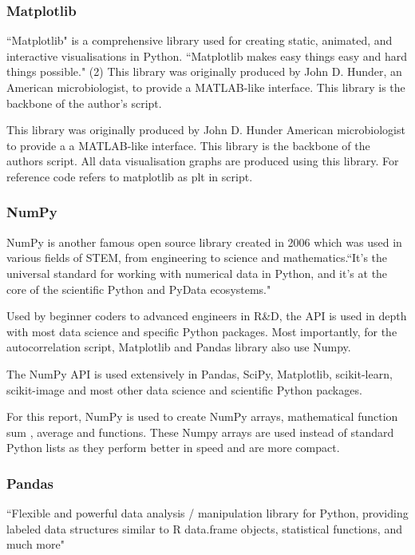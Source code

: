 \subsubsection{Matplotlib}
``Matplotlib" is a comprehensive library used for creating static, animated, and interactive visualisations in Python. ``Matplotlib makes easy things easy and hard things possible." (2)
This library was originally produced by John D. Hunder, an American microbiologist, to provide a MATLAB-like interface. This library is the backbone of the author's script. \cite{matplotlib}

This library was originally produced by John D. Hunder American microbiologist to provide a a MATLAB-like interface. 
This library is the backbone of the authors script. All data visualisation graphs are produced using this library. For reference code refers to matplotlib as plt in script. 

\subsubsection{NumPy}
NumPy is another famous open source library created in 2006 which was used in various fields of STEM, from engineering to science and mathematics.``It’s the universal standard for working with numerical data in Python, and it’s at the core of the scientific Python and PyData ecosystems." \cite{mhvk}

Used by beginner coders to advanced engineers in R\&D, the API is used in depth with most data science and specific Python packages. Most importantly, for the autocorrelation script, Matplotlib and Pandas library also use Numpy.  

The NumPy API is used extensively in Pandas, SciPy, Matplotlib, scikit-learn, scikit-image and most other data science and scientific Python packages.

For this report, NumPy is used to create NumPy arrays, mathematical function sum \cite{mhvk}, average and functions. These Numpy arrays are used instead of standard Python lists as they perform better in speed and are more compact. 

\subsubsection{Pandas}

``Flexible and powerful data analysis / manipulation library for Python, providing labeled data structures similar to R data.frame objects, statistical functions, and much more" \cite{pandas}

